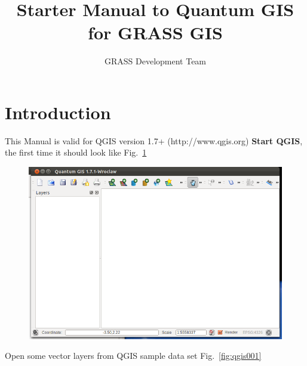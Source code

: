 %

\graphicspath{{./images/}}

\title{Starter Manual to Quantum GIS for GRASS GIS}
\subtitle{}
\author{GRASS Development Team}

\maketitle

\section{Introduction}

This Manual is valid for QGIS version 1.7+ (http://www.qgis.org)
\textbf{Start QGIS}, the first time it should look like Fig.~\ref{fig:qgis000}

\begin{figure}[htbp]
   \centering
   \includegraphics[scale=0.18]{qgis000.png}
   \caption{}
   \label{fig:qgis000}
\end{figure}

Open some vector layers from QGIS sample data set Fig.~\ref{fig:qgis001}

